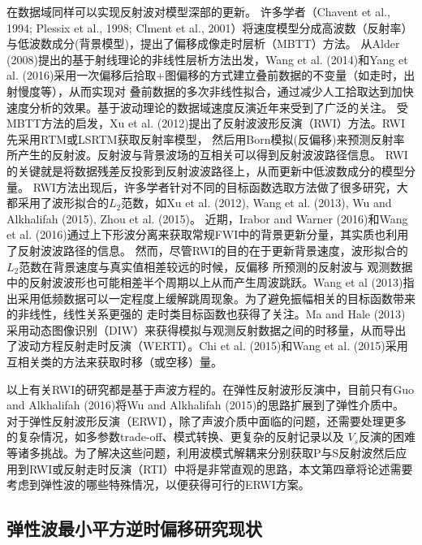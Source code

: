 在数据域同样可以实现反射波对模型深部的更新。
许多学者（Chavent et al., 1994\cite{ChaventEtAl1994}; Plessix et al., 1998\cite{PlessixEtAl1998}; Clment et al., 2001\cite{ClementEtAl2001}）将速度模型分成高波数（反射率）与低波数成分(背景模型)，提出了偏移成像走时层析（MBTT）方法。
从Alder (2008)\cite{Adler2008}提出的基于射线理论的非线性层析方法出发，Wang
et al. (2014)\cite{WangEtAl2014}和Yang et al. (2016)\cite{YangEtAl2016}采用一次偏移后拾取+图偏移的方式建立叠前数据的不变量（如走时，出射慢度等），从而实现对
叠前数据的多次非线性拟合，通过减少人工拾取达到加快速度分析的效果。基于波动理论的数据域速度反演近年来受到了广泛的关注。
受MBTT方法的启发，Xu et al. (2012)\cite{xu:2012}提出了反射波波形反演（RWI）方法。RWI先采用RTM或LSRTM获取反射率模型，
然后用Born模拟(反偏移)来预测反射率所产生的反射波。反射波与背景波场的互相关可以得到反射波波路径信息。
RWI的关键就是将数据残差反投影到反射波波路径上，从而更新中低波数成分的模型分量。
RWI方法出现后，许多学者针对不同的目标函数选取方法做了很多研究，大都采用了波形拟合的$L_2$范数，如Xu
et al. (2012)\cite{xu:2012}, Wang et al. (2013)\cite{Wang2013}, Wu and
Alkhalifah (2015)\cite{Wu2015b},
Zhou et
al. (2015)\cite{zhou:2015}。
近期，Irabor and
Warner (2016)\cite{Irabor2016}和Wang et al. (2016)\cite{WangFangEtAl2016}通过上下形波分离来获取常规FWI中的背景更新分量，其实质也利用了反射波波路径的信息。
然而，尽管RWI的目的在于更新背景速度，波形拟合的$L_2$范数在背景速度与真实值相差较远的时候，反偏移
所预测的反射波与
观测数据中的反射波波形也可能相差半个周期以上从而产生周波跳跃。Wang et
al (2013)\cite{Wang2013}指出采用低频数据可以一定程度上缓解跳周现象。为了避免振幅相关的目标函数带来的非线性，线性关系更强的
走时类目标函数也获得了关注。Ma and
Hale (2013)\cite{ma2013}采用动态图像识别（DIW）来获得模拟与观测反射数据之间的时移量，从而导出了波动方程反射走时反演（WERTI）。Chi
et al. (2015)\cite{chi2015}和Wang et al.
(2015)\cite{Wang2015}采用互相关类的方法来获取时移（或空移）量。

以上有关RWI的研究都是基于声波方程的。在弹性反射波形反演中，目前只有Guo and
Alkhalifah (2016)\cite{Guo2016}将Wu and
Alkhalifah (2015)\cite{Wu2015b}的思路扩展到了弹性介质中。
对于弹性反射波形反演（ERWI），除了声波介质中面临的问题，还需要处理更多的复杂情况，如多参数trade-off、模式转换、更复杂的反射记录以及
$V_s$反演的困难等诸多挑战。为了解决这些问题，利用波模式解耦来分别获取P与S反射波然后应用到RWI或反射走时反演（RTI）中将是非常直观的思路，本文第四章将论述需要
考虑到弹性波的哪些特殊情况，以便获得可行的ERWI方案。

\subsection{弹性波最小平方逆时偏移研究现状}

